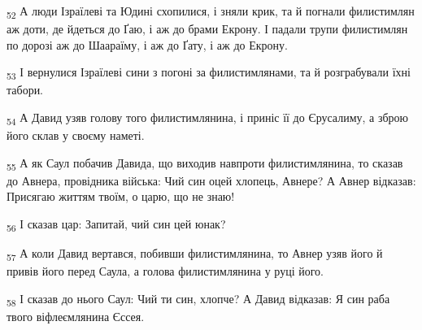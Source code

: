 \begin{tcolorbox}
\textsubscript{52} А люди Ізраїлеві та Юдині схопилися, і зняли крик, та й погнали филистимлян аж доти, де йдеться до Ґаю, і аж до брами Екрону. І падали трупи филистимлян по дорозі аж до Шаараїму, і аж до Ґату, і аж до Екрону.
\end{tcolorbox}
\begin{tcolorbox}
\textsubscript{53} І вернулися Ізраїлеві сини з погоні за филистимлянами, та й розграбували їхні табори.
\end{tcolorbox}
\begin{tcolorbox}
\textsubscript{54} А Давид узяв голову того филистимлянина, і приніс її до Єрусалиму, а зброю його склав у своєму наметі.
\end{tcolorbox}
\begin{tcolorbox}
\textsubscript{55} А як Саул побачив Давида, що виходив навпроти филистимлянина, то сказав до Авнера, провідника війська: Чий син оцей хлопець, Авнере? А Авнер відказав: Присягаю життям твоїм, о царю, що не знаю!
\end{tcolorbox}
\begin{tcolorbox}
\textsubscript{56} І сказав цар: Запитай, чий син цей юнак?
\end{tcolorbox}
\begin{tcolorbox}
\textsubscript{57} А коли Давид вертався, побивши филистимлянина, то Авнер узяв його й привів його перед Саула, а голова филистимлянина у руці його.
\end{tcolorbox}
\begin{tcolorbox}
\textsubscript{58} І сказав до нього Саул: Чий ти син, хлопче? А Давид відказав: Я син раба твого віфлеємлянина Єссея.
\end{tcolorbox}
